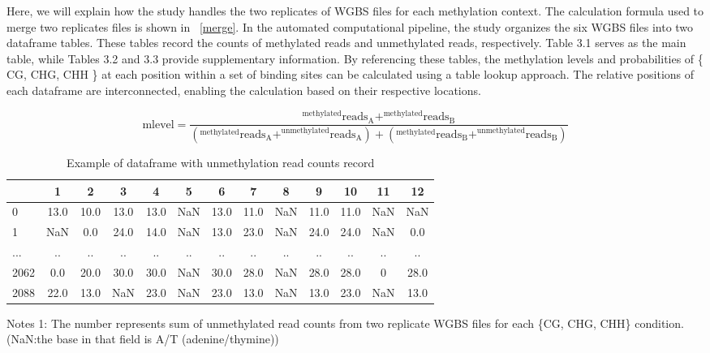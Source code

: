 \documentclass{PHlab-thesis}
\begin{document}
Here, we will explain how the study handles the two replicates of WGBS files for each methylation context. The calculation formula used to merge two replicates files is shown in ~\ref{merge}. In the automated computational pipeline, the study organizes the six WGBS files into two dataframe tables. These tables record the counts of methylated reads and unmethylated reads, respectively. Table 3.1 serves as the main table, while Tables 3.2 and 3.3 provide supplementary information. By referencing these tables, the methylation levels and probabilities of \{ CG, CHG, CHH \} at each position within a set of binding sites can be calculated using a table lookup approach. The relative positions of each dataframe are interconnected, enabling the calculation based on their respective locations.\begin{small}
\begin{equation} \label{merge}
	 \text{mlevel} = \frac{^{\text{methylated}}\text{reads}_{\text{A}} + ^{\text{methylated}}\text{reads}_{\text{B}}}{(^{\text{methylated}}\text{reads}_{\text{A}} + ^{\text{unmethylated}}\text{reads}_{\text{A}})+ (^{\text{methylated}}\text{reads}_{\text{B}} + ^{\text{unmethylated}}\text{reads}_{\text{B}})}
\end{equation}
\end{small}
\begin{table}[H]
	\centering
	\begin{tabular}{l*{12}{c}}
		\toprule
		         & 1 &  2&  3&4  &5&6&7&8&  9& 10 & 11&12\\
		\midrule
		
		0     &13.0  &10.0  &13.0  &13.0   &NaN  &13.0  &11.0   &NaN &11.0  &11.0   &NaN   &NaN\\
		1     &NaN   &0.0  &24.0  &14.0  &NaN  &13.0  &23.0   &NaN  &24.0  &24.0  &NaN   &0.0\\
		...   &.. &.. &.. &.. &.. &.. &.. &.. &.. &.. &.. &..\\
		
		2062   &0.0  &20.0  &30.0  &30.0   &NaN  &30.0  &28.0   &NaN  &28.0  &28.0   &0  &28.0\\
		2088 &22.0  &13.0   &NaN  &23.0   &NaN  &23.0  &13.0  &NaN  &13.0  &23.0   &NaN  &13.0\\
		\bottomrule
	\end{tabular}
	\begin{minipage}{15.5cm}
		\vspace{0.1cm}
		\footnotesize  Notes 1: The number represents sum of unmethylated read counts from two replicate WGBS files for each \{CG, CHG, CHH\} condition. (NaN:the base in that field is A/T (adenine/thymine))
	\end{minipage}
	\caption{Example of dataframe with unmethylation read counts record}
	\label{table:unmethylated}
\end{table}
\end{document}
